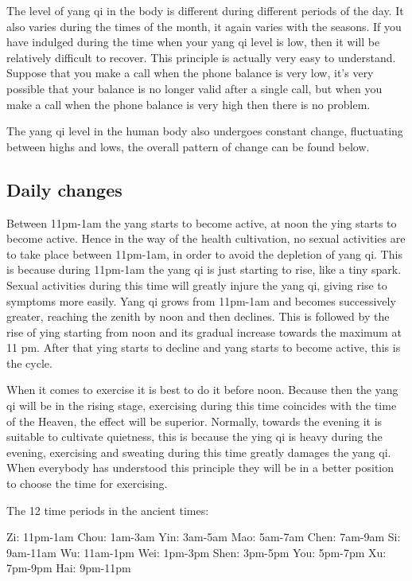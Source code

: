 \documentclass[
]{book}
\begin{document}
The level of yang qi in the body is different during different periods of the day. It also varies during the times of the month, it again varies with the seasons. If you have indulged during the time when your yang qi level is low, then it will be relatively difficult to recover. This principle is actually very easy to understand. Suppose that you make a call when the phone balance is very low, it's very possible that your balance is no longer valid after a single call, but when you make a call when the phone balance is very high then there is no problem.

The yang qi level in the human body also undergoes constant change, fluctuating between highs and lows, the overall pattern of change can be found below.

\hypertarget{daily-changes}{%
\subsection{Daily changes}\label{daily-changes}}

Between 11pm-1am the yang starts to become active, at noon the ying starts to become active. Hence in the way of the health cultivation, no sexual activities are to take place between 11pm-1am, in order to avoid the depletion of yang qi. This is because during 11pm-1am the yang qi is just starting to rise, like a tiny spark. Sexual activities during this time will greatly injure the yang qi, giving rise to symptoms more easily. Yang qi grows from 11pm-1am and becomes successively greater, reaching the zenith by noon and then declines. This is followed by the rise of ying starting from noon and its gradual increase towards the maximum at 11 pm. After that ying starts to decline and yang starts to become active, this is the cycle.

When it comes to exercise it is best to do it before noon. Because then the yang qi will be in the rising stage, exercising during this time coincides with the time of the Heaven, the effect will be superior. Normally, towards the evening it is suitable to cultivate quietness, this is because the ying qi is heavy during the evening, exercising and sweating during this time greatly damages the yang qi. When everybody has understood this principle they will be in a better position to choose the time for exercising.

The 12 time periods in the ancient times:

Zi: 11pm-1am
Chou: 1am-3am
Yin: 3am-5am
Mao: 5am-7am
Chen: 7am-9am
Si: 9am-11am
Wu: 11am-1pm
Wei: 1pm-3pm
Shen: 3pm-5pm
You: 5pm-7pm
Xu: 7pm-9pm
Hai: 9pm-11pm
\end{document}
